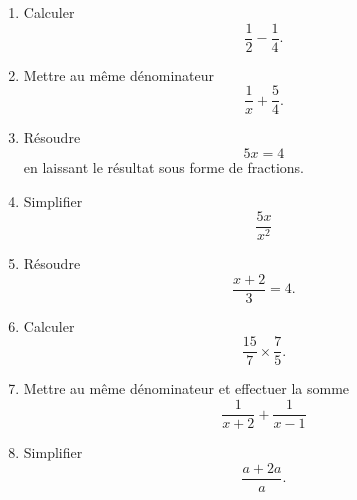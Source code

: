 
\begin{exercice}\label{exosmath-0018}

    \begin{multicols}{2}
    \begin{enumerate}
        \item
            Calculer
            \begin{equation}
                \frac{ 1 }{2}-\frac{1}{ 4 }.
            \end{equation}
        \item
            Mettre au même dénominateur
            \begin{equation}
                \frac{1}{ x }+\frac{ 5 }{ 4 }.
            \end{equation}
        \item
            Résoudre 
            \begin{equation}
                5x=4
            \end{equation}
            en laissant le résultat sous forme de fractions.
        \item
            Simplifier
            \begin{equation}
                \frac{ 5x }{ x^2 }
            \end{equation}
        \item
            Résoudre
            \begin{equation}
                \frac{ x+2 }{ 3 }=4.
            \end{equation}
        \item
            Calculer
            \begin{equation}
                \frac{ 15 }{ 7 }\times \frac{ 7 }{ 5 }.
            \end{equation}
        \item
            Mettre au même dénominateur et effectuer la somme
            \begin{equation}
                \frac{1}{ x+2 }+\frac{1}{ x-1 }
            \end{equation}
        \item
            Simplifier 
            \begin{equation}
                \frac{ a+2a }{ a }.
            \end{equation}



\end{enumerate}
\end{multicols}
\end{exercice}
